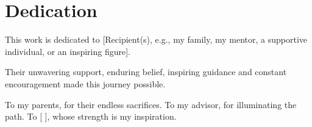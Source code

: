 \chapter*{Dedication}
This work is dedicated to [Recipient(s), e.g., my family, my mentor, a supportive individual, or an inspiring figure].

Their unwavering support, enduring belief, inspiring guidance and constant encouragement made this journey possible.

To my parents, for their endless sacrifices.
To my advisor, for illuminating the path.
To [   ], whose strength is my inspiration.